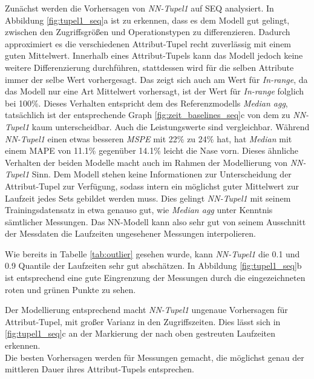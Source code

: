 \documentclass[
	12pt,
	a4paper,
	BCOR10mm,
	DIV14,
	listof=totoc,
	bibliography=totoc,
	headsepline
]{scrreprt}
\begin{document}
Zunächst werden die Vorhersagen von \textit{NN-Tupel1} auf SEQ analysiert.
In Abbildung \ref{fig:tupel1_seq}a ist zu erkennen, dass es dem Modell gut gelingt, zwischen den Zugriffsgrößen und Operationstypen zu differenzieren. Dadurch approximiert es die verschiedenen Attribut-Tupel recht zuverlässig mit einem guten Mittelwert.
Innerhalb eines Attribut-Tupels kann das Modell jedoch keine weitere Differenzierung durchführen, stattdessen wird für die selben Attribute immer der selbe Wert vorhergesagt.
Das zeigt sich auch am Wert für \textit{In-range}, da das Modell nur eine Art Mittelwert vorhersagt, ist der Wert für \textit{In-range} folglich bei 100\%.
Dieses Verhalten entspricht dem des Referenzmodells \textit{Median agg}, tatsächlich ist der entsprechende Graph \ref{fig:zeit_baselines_seq}c von dem zu \textit{NN-Tupel1} kaum unterscheidbar.
Auch die Leistungswerte sind vergleichbar. Während \textit{NN-Tupel1} einen etwas besseren \textit{MSPE} mit 22\% zu 24\% hat, hat \textit{Median} mit einem MAPE von 11.1\% gegenüber 14.1\% leicht die Nase vorn. 
Dieses ähnliche Verhalten  der beiden Modelle macht auch im Rahmen der Modellierung von \textit{NN-Tupel1} Sinn.
Dem Modell stehen keine Informationen zur Unterscheidung der Attribut-Tupel zur Verfügung, sodass intern ein möglichst guter Mittelwert zur Laufzeit jedes Sets gebildet werden muss. Dies gelingt \textit{NN-Tupel1} mit seinem Trainingsdatensatz in etwa genauso gut, wie \textit{Median agg} unter Kenntnis sämtlicher Messungen. Das NN-Modell kann also sehr gut von seinem Ausschnitt der Messdaten die Laufzeiten ungesehener Messungen interpolieren.\medskip

Wie bereits in Tabelle \ref{tab:outlier} gesehen wurde, kann \textit{NN-Tupel1} die 0.1 und 0.9 Quantile der Laufzeiten sehr gut abschätzen.
In Abbildung \ref{fig:tupel1_seq}b ist entsprechend eine gute Eingrenzung der Messungen durch die eingezeichneten roten und grünen Punkte zu sehen.\medskip

Der Modellierung entsprechend macht \textit{NN-Tupel1} ungenaue Vorhersagen für Attribut-Tupel, mit großer Varianz in den Zugriffszeiten. 
Dies lässt sich in \ref{fig:tupel1_seq}c an der Markierung der nach oben gestreuten Laufzeiten erkennen.\\
Die besten Vorhersagen werden für Messungen gemacht, die möglichst genau der mittleren Dauer ihres Attribut-Tupels entsprechen.\medskip
\end{document}
